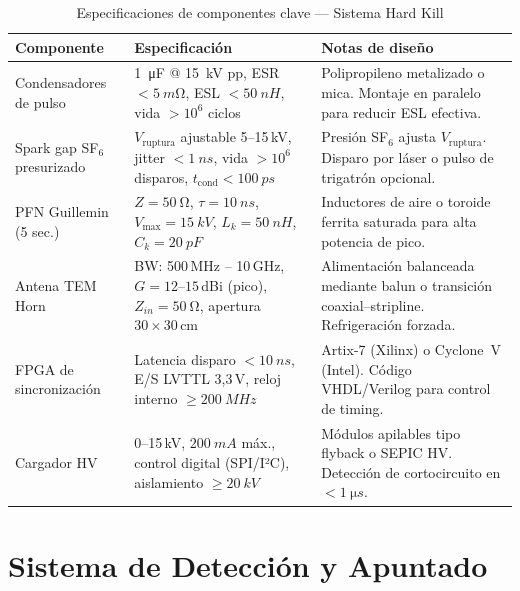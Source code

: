 \documentclass[12pt,a4paper]{article}
\begin{document}
\begin{table}[H]
\centering
\caption{Especificaciones de componentes clave — Sistema Hard Kill}
\label{tab:comp_hk}
\renewcommand{\arraystretch}{1.25}
\begin{tabularx}{\textwidth}{lXX}
\toprule
\textbf{Componente} & \textbf{Especificación} & \textbf{Notas de diseño} \\
\midrule
Condensadores de pulso &
  \SI{1}{\micro F} @ \SI{15}{kV} pp,
  ESR $< \SI{5}{m\ohm}$, ESL $< \SI{50}{nH}$,
  vida $> 10^6$ ciclos &
  Polipropileno metalizado o mica. Montaje en paralelo para
  reducir ESL efectiva. \\[4pt]

Spark gap SF$_6$ presurizado &
  $V_\mathrm{ruptura}$ ajustable 5–15\,kV,
  jitter $< \SI{1}{ns}$,
  vida $> 10^6$ disparos,
  $t_\mathrm{cond} < \SI{100}{ps}$ &
  Presión SF$_6$ ajusta $V_\mathrm{ruptura}$.
  Disparo por láser o pulso de trigatrón opcional. \\[4pt]

PFN Guillemin (5 sec.) &
  $Z = \SI{50}{\ohm}$, $\tau = \SI{10}{ns}$,
  $V_\mathrm{max} = \SI{15}{kV}$,
  $L_k = \SI{50}{nH}$, $C_k = \SI{20}{pF}$ &
  Inductores de aire o toroide ferrita saturada para
  alta potencia de pico. \\[4pt]

Antena TEM Horn &
  BW: 500\,MHz – 10\,GHz,
  $G = 12$–$15$\,dBi (pico),
  $Z_{in} = \SI{50}{\ohm}$,
  apertura $30 \times 30$\,cm &
  Alimentación balanceada mediante balun o transición
  coaxial–stripline. Refrigeración forzada. \\[4pt]

FPGA de sincronización &
  Latencia disparo $< \SI{10}{ns}$,
  E/S LVTTL 3,3\,V,
  reloj interno $\geq \SI{200}{MHz}$ &
  Artix-7 (Xilinx) o Cyclone~V (Intel).
  Código VHDL/Verilog para control de timing. \\[4pt]

Cargador HV &
  0–15\,kV, $\SI{200}{mA}$ máx.,
  control digital (SPI/I²C),
  aislamiento $\geq \SI{20}{kV}$ &
  Módulos apilables tipo flyback o SEPIC HV.
  Detección de cortocircuito en $< \SI{1}{\micro s}$.\\
\bottomrule
\end{tabularx}
\end{table}

\newpage

\section{Sistema de Detección y Apuntado}
\end{document}
